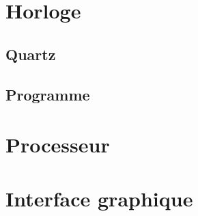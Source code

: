 \documentclass[11pt]{beamer}
\begin{document}
\section{Horloge}

\subsection{Quartz}

\subsection{Programme}



\section{Processeur}



\section{Interface graphique}
\end{document}
